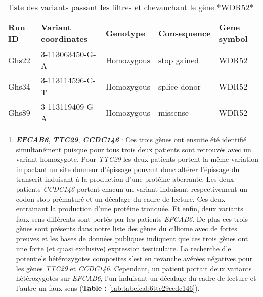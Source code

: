 \documentclass[12pt,twoside]{reedthesis}
\providecommand{\tightlist}{%
  \setlength{\itemsep}{0pt}\setlength{\parskip}{0pt}}
\theoremstyle{definition}
\theoremstyle{definition}
\theoremstyle{remark}
\begin{document}
  \begin{longtable}[t]{lllll}
  \caption{\label{tab:tabwdr52}liste des variants passant les filtres et chevauchant le gène *WDR52*}\\
  \toprule
  Run ID & Variant coordinates & Genotype & Consequence & Gene symbol\\
  \midrule
  Ghs22 & 3-113063450-G-A & Homozygous & stop gained & WDR52\\
  Ghs34 & 3-113114596-C-T & Homozygous & splice donor & WDR52\\
  Ghs89 & 3-113119409-G-A & Homozygous & missense & WDR52\\
  \bottomrule
  \end{longtable}
  
  \begin{enumerate}
  \def\labelenumi{\arabic{enumi}.}
  \setcounter{enumi}{1}
  \tightlist
  \item
    \textbf{\emph{EFCAB6}}, \textbf{\emph{TTC29}}, \textbf{\emph{CCDC146}}
    : Ces trois gènes ont ensuite été identifié simultanément puisque pour
    tous trois deux patients sont retrouvés avec un variant homozygote.
    Pour \emph{TTC29} les deux patients portent la même variation
    impactant un site donneur d'épissage pouvant donc altérer l'épissage
    du transcrit induisant à la production d'une protéine aberrante. Les
    deux patients \emph{CCDC146} portent chacun un variant induisant
    respectivement un codon stop prématuré et un décalage du cadre de
    lecture. Ces deux entrainant la production d'une protéine tronquée. Et
    enfin, deux variants faux-sens différents sont portés par les patients
    \emph{EFCAB6}. De plus ces trois gènes sont présents dans notre liste
    des gènes du cilliome avec de fortes preuves et les bases de données
    publiques indiquent que ces trois gènes ont une forte (et quasi
    exclusive) expression testiculaire. La recherche d'e potentiels
    hétérozygotes composites s'est en revanche avérées négatives pour les
    gènes \emph{TTC29} et \emph{CCDC146}. Cependant, un patient portait
    deux variants hétérozygotes sur \emph{EFCAB6}, l'un induisant un
    décalage du cadre de lecture et l'autre un faux-sens (\textbf{Table :
    }\ref{tab:tabefcab6ttc29ccdc146}). \newpage
  \end{enumerate}
  
\end{document}
